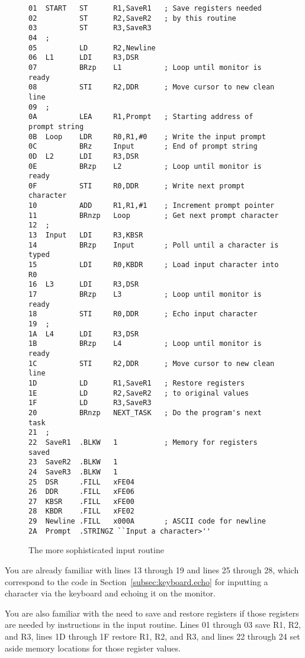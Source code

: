 \documentclass{patt}
\begin{document}
\begin{figure}[h!]
\begin{Verbatim}[fontsize=\fontsize{9}{11}\selectfont]
01  START   ST      R1,SaveR1   ; Save registers needed
02          ST      R2,SaveR2   ; by this routine
03          ST      R3,SaveR3
04  ;
05          LD      R2,Newline
06  L1      LDI     R3,DSR
07          BRzp    L1          ; Loop until monitor is ready
08          STI     R2,DDR      ; Move cursor to new clean line
09  ;
0A          LEA     R1,Prompt   ; Starting address of prompt string
0B  Loop    LDR     R0,R1,#0    ; Write the input prompt
0C          BRz     Input       ; End of prompt string
0D  L2      LDI     R3,DSR
0E          BRzp    L2          ; Loop until monitor is ready
0F          STI     R0,DDR      ; Write next prompt character
10          ADD     R1,R1,#1    ; Increment prompt pointer
11          BRnzp   Loop        ; Get next prompt character
12  ;
13  Input   LDI     R3,KBSR
14          BRzp    Input       ; Poll until a character is typed
15          LDI     R0,KBDR     ; Load input character into R0
16  L3      LDI     R3,DSR
17          BRzp    L3          ; Loop until monitor is ready
18          STI     R0,DDR      ; Echo input character
19  ;
1A  L4      LDI     R3,DSR
1B          BRzp    L4          ; Loop until monitor is ready
1C          STI     R2,DDR      ; Move cursor to new clean line
1D          LD      R1,SaveR1   ; Restore registers
1E          LD      R2,SaveR2   ; to original values
1F          LD      R3,SaveR3
20          BRnzp   NEXT_TASK   ; Do the program's next task
21  ;
22  SaveR1  .BLKW   1           ; Memory for registers saved
23  SaveR2  .BLKW   1
24  SaveR3  .BLKW   1
25  DSR     .FILL   xFE04
26  DDR     .FILL   xFE06
27  KBSR    .FILL   xFE00
28  KBDR    .FILL   xFE02
29  Newline .FILL   x000A       ; ASCII code for newline
2A  Prompt  .STRINGZ ``Input a character>''
\end{Verbatim}
\caption{The more sophisticated input routine}
\label{fig:sophisticated.routine}
\end{figure}

You are already familiar with lines 13 through 19 and lines 25 through
28, which correspond to the code in Section~\ref{subsec:keyboard.echo}
for inputting a character via the keyboard and echoing it on the
monitor. 

You are also familiar with the need to save and restore registers if those
registers are needed by instructions in the input routine.  Lines 01 through 
03 save R1, R2, and R3, lines 1D through 1F restore R1, R2, and R3, and 
lines 22 through 24 set aside memory locations for those register values.
\end{document}
